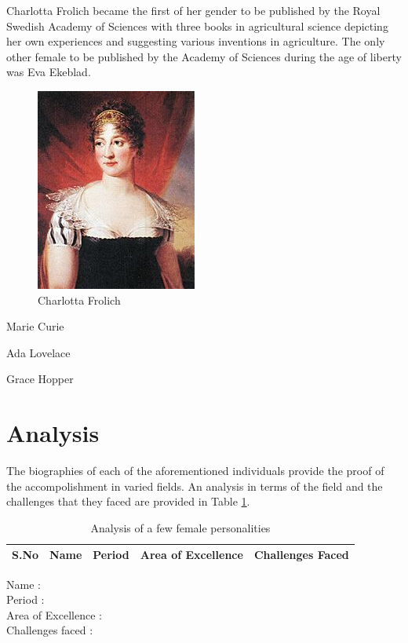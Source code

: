 \documentclass[a4paper,10pt]{article}
\begin{document}
\newblock
Charlotta Frolich became the first of her gender to be published by the Royal Swedish Academy of Sciences with three books in agricultural science depicting her own experiences and suggesting various inventions in agriculture. The only other female to be published by the Academy of Sciences during the age of liberty was Eva Ekeblad\cite{frolich}.

\begin{center}
\begin{figure}[h]
\centering
 \includegraphics[scale=0.7]{charlotta.jpg}
 \caption{Charlotta Frolich}
\end{figure}
\end{center}

Marie Curie

Ada Lovelace

Grace Hopper

\section{Analysis}
The biographies of each of the aforementioned individuals provide the proof of the accompolishment in varied fields. An analysis in terms of the field and the challenges that they faced are provided in Table \ref{tab:analysis}.
\begin{table}
\label{tab:analysis}
\caption{Analysis of a few female personalities}
\centering
 \begin{tabular}{|l|l|l|l|l|}
  \hline
  S.No & Name & Period & Area of Excellence & Challenges Faced \\
  \hline
 
 \end{tabular}

\end{table}


\newblock
Name : \\
Period : \\
Area of Excellence : \\
Challenges faced : \\
\end{document}
